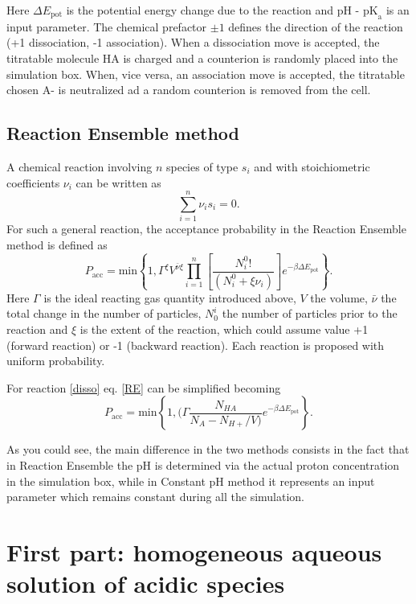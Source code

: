 \documentclass[
a4paper,                        %
11pt,                           %
twoside,                        %
footsepline,                    %
headsepline,                    %
headexclude,                    %
footexclude,                    %
pagesize,                       %
]{scrartcl}
\begin{document}
Here $\Delta E_\text{pot}$ is the potential energy change due to the reaction and $\text{pH - pK}_\text{a}$ is an input parameter. The chemical prefactor $\pm 1$ defines the direction of the reaction (+1 dissociation, -1 association).
When a dissociation move is accepted, the titratable molecule HA is charged and a counterion is randomly placed into the simulation box. When, vice versa, an association move is accepted, the titratable chosen A- is neutralized ad a random counterion is removed from the cell.


\subsection{Reaction Ensemble method}
A chemical reaction involving ${n}$ species of type ${s_i}$ and with stoichiometric coefficients $\nu_i$ can be written as 
\begin{equation}
\sum_{i = 1}^n \nu_{i} s_i = 0\text{.}
\end{equation}
For such a general reaction, the acceptance probability in the Reaction Ensemble method is defined as
\begin{equation}\label{RE}
P_{\text{acc}} = \text{min} \left\lbrace 1, \Gamma^\xi V^{\bar{\nu}\xi} \prod_{i = 1}^{n} \left[ \frac{N_{i}^0!}{(N_{i}^{0} + \xi \nu_i)}  \right] e^{-\beta \Delta E_\text{pot}}  \right\rbrace\text{.}
\end{equation}
Here $\Gamma$ is the ideal reacting gas quantity introduced above, $V$ the volume, $\bar{\nu}$ the total change in the number of particles, $N_0^i$ the number of particles prior to the reaction and $\xi$ is the extent of the reaction, which could assume value +1 (forward reaction) or -1 (backward reaction). Each reaction is proposed with uniform probability. 

\noindent For reaction \ref{disso} eq. \ref{RE} can be simplified becoming 
\begin{equation}
P_{\text{acc}} = \text{min} \left\lbrace 1, (  \Gamma \frac{N_{HA}}{N_A - N_{H+}/V)} e^{-\beta \Delta E_\text{pot}}  \right\rbrace\text{.}
\end{equation}

As you could see, the main difference in the two methods consists in the fact that in Reaction Ensemble the pH is determined via the actual proton concentration in the simulation box, while in Constant pH method it represents an input parameter which remains constant during all the simulation.


\section{First part: homogeneous aqueous solution of acidic species}
\end{document}
